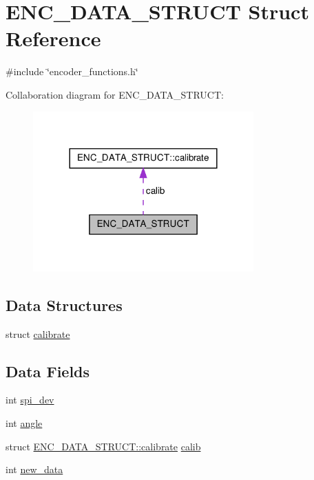 \hypertarget{structENC__DATA__STRUCT}{\section{E\-N\-C\-\_\-\-D\-A\-T\-A\-\_\-\-S\-T\-R\-U\-C\-T Struct Reference}
\label{structENC__DATA__STRUCT}
}


{\ttfamily \#include \char`\"{}encoder\-\_\-functions.\-h\char`\"{}}



Collaboration diagram for E\-N\-C\-\_\-\-D\-A\-T\-A\-\_\-\-S\-T\-R\-U\-C\-T\-:\nopagebreak
\begin{figure}[H]
\begin{center}
\leavevmode
\includegraphics[width=240pt]{structENC__DATA__STRUCT__coll__graph}
\end{center}
\end{figure}
\subsection*{Data Structures}
\begin{DoxyCompactItemize}
\item 
struct \hyperlink{structENC__DATA__STRUCT_1_1calibrate}{calibrate}
\end{DoxyCompactItemize}
\subsection*{Data Fields}
\begin{DoxyCompactItemize}
\item 
int \hyperlink{structENC__DATA__STRUCT_a93b8e925392a12a8874bf59f2a1cd76a}{spi\-\_\-dev}
\item 
int \hyperlink{structENC__DATA__STRUCT_ad25beb30fd5b975292f87db02ec9930a}{angle}
\item 
struct \hyperlink{structENC__DATA__STRUCT_1_1calibrate}{E\-N\-C\-\_\-\-D\-A\-T\-A\-\_\-\-S\-T\-R\-U\-C\-T\-::calibrate} \hyperlink{structENC__DATA__STRUCT_af227e5bbb714b830cc570432bda0a468}{calib}
\item 
int \hyperlink{structENC__DATA__STRUCT_adbfb6e5764f0e3c42f4e212deb5d1f21}{new\-\_\-data}
\end{DoxyCompactItemize}



